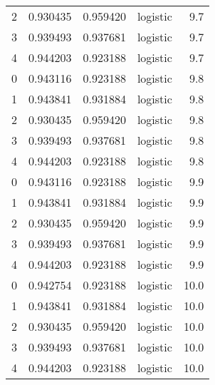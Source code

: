 \begin{tabular}{rrrlr}
     2 & 0.930435 & 0.959420 & logistic &        9.7 \\
     3 & 0.939493 & 0.937681 & logistic &        9.7 \\
     4 & 0.944203 & 0.923188 & logistic &        9.7 \\
     0 & 0.943116 & 0.923188 & logistic &        9.8 \\
     1 & 0.943841 & 0.931884 & logistic &        9.8 \\
     2 & 0.930435 & 0.959420 & logistic &        9.8 \\
     3 & 0.939493 & 0.937681 & logistic &        9.8 \\
     4 & 0.944203 & 0.923188 & logistic &        9.8 \\
     0 & 0.943116 & 0.923188 & logistic &        9.9 \\
     1 & 0.943841 & 0.931884 & logistic &        9.9 \\
     2 & 0.930435 & 0.959420 & logistic &        9.9 \\
     3 & 0.939493 & 0.937681 & logistic &        9.9 \\
     4 & 0.944203 & 0.923188 & logistic &        9.9 \\
     0 & 0.942754 & 0.923188 & logistic &       10.0 \\
     1 & 0.943841 & 0.931884 & logistic &       10.0 \\
     2 & 0.930435 & 0.959420 & logistic &       10.0 \\
     3 & 0.939493 & 0.937681 & logistic &       10.0 \\
     4 & 0.944203 & 0.923188 & logistic &       10.0 \\
\bottomrule
\end{tabular}
